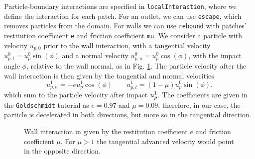 Particle-boundary interactions are specified in \lstinline|localInteraction|, where we define the interaction for each patch. For an outlet, we can use \lstinline|escape|, which removes particles from the domain.
For walls we can use \lstinline|rebound| with patches' restitution coefficient \lstinline|e| and friction coefficient \lstinline|mu|.
We consider a particle with velocity $u_{p,0}$ prior to the wall interaction, with a tangential velocity $u_{p,t}^0 = u_{p}^0 \sin ( \phi)$ and a normal velocity $u_{p,n}^0 = u_{p}^0 \cos ( \phi)$, with the impact angle $\phi$, relative to the wall normal, as in Fig. \ref{fig:wall_interaction}. The particle velocity after the wall interaction is then given by the tangential and normal velocities
\begin{equation}
    u_{p,n}^1 = - e u_p^1 \cos (\phi) \qquad u_{p,t}^1 = (1- \mu) u_{p}^0 \sin (\phi).
\end{equation}
which sum to the particle velocity after impact $u_p^1$.
The coefficients are given in the \lstinline|Goldschmidt| tutorial as $e = 0.97$ and $\mu = 0.09$, therefore, in our case, the particle is decelerated in both directions, but more so in the tangential direction.
\begin{figure}[!ht]
\centering
{}%
\caption{Wall interaction in \OF given by the restitution coefficient $e$ and friction coefficient $\mu$. For $\mu > 1$ the tangential advanced velocity would point in the opposite direction.}
\label{fig:wall_interaction}
\end{figure}





